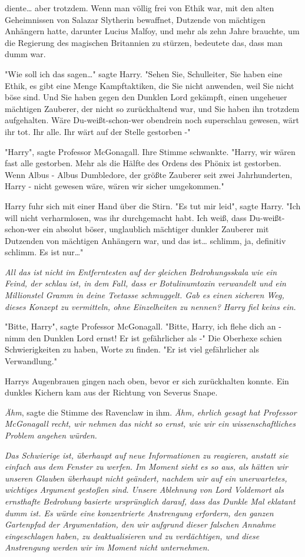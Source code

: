 {diente… aber trotzdem. Wenn man völlig frei von Ethik war, mit den alten Geheimnissen von Salazar Slytherin bewaffnet, Dutzende von mächtigen Anhängern hatte, darunter Lucius Malfoy, und mehr als zehn Jahre brauchte, um die Regierung des magischen Britannien zu stürzen, bedeutete das, dass man dumm war.

"Wie soll ich das sagen…" sagte Harry. "Sehen Sie, Schulleiter, Sie haben eine Ethik, es gibt eine Menge Kampftaktiken, die Sie nicht anwenden, weil Sie nicht böse sind. Und Sie haben gegen den Dunklen Lord gekämpft, einen ungeheuer mächtigen Zauberer, der nicht so zurückhaltend war, und Sie haben ihn trotzdem aufgehalten. Wäre Du-weißt-schon-wer obendrein noch superschlau gewesen, wärt ihr tot. Ihr alle. Ihr wärt auf der Stelle gestorben -"

"Harry", sagte Professor McGonagall. Ihre Stimme schwankte. "Harry, wir wären fast alle gestorben. Mehr als die Hälfte des Ordens des Phönix ist gestorben. Wenn Albus - Albus Dumbledore, der größte Zauberer seit zwei Jahrhunderten, Harry - nicht gewesen wäre, wären wir sicher umgekommen."

Harry fuhr sich mit einer Hand über die Stirn. "Es tut mir leid", sagte Harry. "Ich will nicht verharmlosen, was ihr durchgemacht habt. Ich weiß, dass Du-weißt-schon-wer ein absolut böser, unglaublich mächtiger dunkler Zauberer mit Dutzenden von mächtigen Anhängern war, und das ist… schlimm, ja, definitiv schlimm. Es ist nur…"

\emph{All das ist nicht im Entferntesten auf der gleichen Bedrohungsskala wie ein Feind, der schlau ist, in dem Fall, dass er Botulinumtoxin verwandelt und ein Millionstel Gramm in deine Teetasse schmuggelt. Gab es einen sicheren Weg, dieses Konzept zu vermitteln, ohne Einzelheiten zu nennen? Harry fiel keins ein.}

"Bitte, Harry", sagte Professor McGonagall. "Bitte, Harry, ich flehe dich an - nimm den Dunklen Lord ernst! Er ist gefährlicher als -" Die Oberhexe schien Schwierigkeiten zu haben, Worte zu finden. "Er ist viel gefährlicher als Verwandlung."

Harrys Augenbrauen gingen nach oben, bevor er sich zurückhalten konnte. Ein dunkles Kichern kam aus der Richtung von Severus Snape.

\emph{Ähm}, sagte die Stimme des Ravenclaw in ihm. \emph{Ähm, ehrlich gesagt hat Professor McGonagall recht, wir nehmen das nicht so ernst, wie wir ein wissenschaftliches Problem angehen würden.}

\emph{Das Schwierige ist, überhaupt auf neue Informationen zu reagieren, anstatt sie einfach aus dem Fenster zu werfen. Im Moment sieht es so aus, als hätten wir unseren Glauben überhaupt nicht geändert, nachdem wir auf ein unerwartetes, wichtiges Argument gestoßen sind. Unsere Ablehnung von Lord Voldemort als ernsthafte Bedrohung basierte ursprünglich darauf, dass das Dunkle Mal eklatant dumm ist. Es würde eine konzentrierte Anstrengung erfordern, den ganzen Gartenpfad der Argumentation, den wir aufgrund dieser falschen Annahme eingeschlagen haben, zu deaktualisieren und zu verdächtigen, und diese Anstrengung werden wir im Moment nicht unternehmen.}

}
